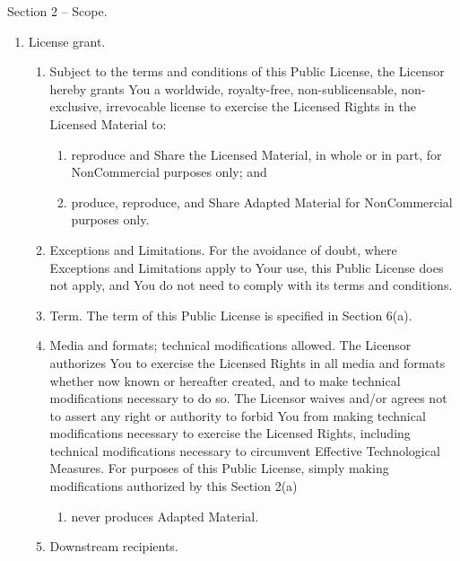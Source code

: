 \documentclass[]{scrbook}
\providecommand{\tightlist}{%
  \setlength{\itemsep}{0pt}\setlength{\parskip}{0pt}}
\begin{document}
Section 2 -- Scope.

\begin{enumerate}
\def\labelenumi{\alph{enumi}.}
\item
  License grant.

  \begin{enumerate}
  \def\labelenumii{\arabic{enumii}.}
  \item
    Subject to the terms and conditions of this Public License, the
    Licensor hereby grants You a worldwide, royalty-free,
    non-sublicensable, non-exclusive, irrevocable license to exercise
    the Licensed Rights in the Licensed Material to:

    \begin{enumerate}
    \def\labelenumiii{\alph{enumiii}.}
    \item
      reproduce and Share the Licensed Material, in whole or in part,
      for NonCommercial purposes only; and
    \item
      produce, reproduce, and Share Adapted Material for NonCommercial
      purposes only.
    \end{enumerate}
  \item
    Exceptions and Limitations. For the avoidance of doubt, where
    Exceptions and Limitations apply to Your use, this Public License
    does not apply, and You do not need to comply with its terms and
    conditions.
  \item
    Term. The term of this Public License is specified in Section 6(a).
  \item
    Media and formats; technical modifications allowed. The Licensor
    authorizes You to exercise the Licensed Rights in all media and
    formats whether now known or hereafter created, and to make
    technical modifications necessary to do so. The Licensor waives
    and/or agrees not to assert any right or authority to forbid You
    from making technical modifications necessary to exercise the
    Licensed Rights, including technical modifications necessary to
    circumvent Effective Technological Measures. For purposes of this
    Public License, simply making modifications authorized by this
    Section 2(a)

    \begin{enumerate}
    \def\labelenumiii{(\arabic{enumiii})}
    \setcounter{enumiii}{3}
    \tightlist
    \item
      never produces Adapted Material.
    \end{enumerate}
  \item
    Downstream recipients.


\end{enumerate}
\end{enumerate}
\end{document}
